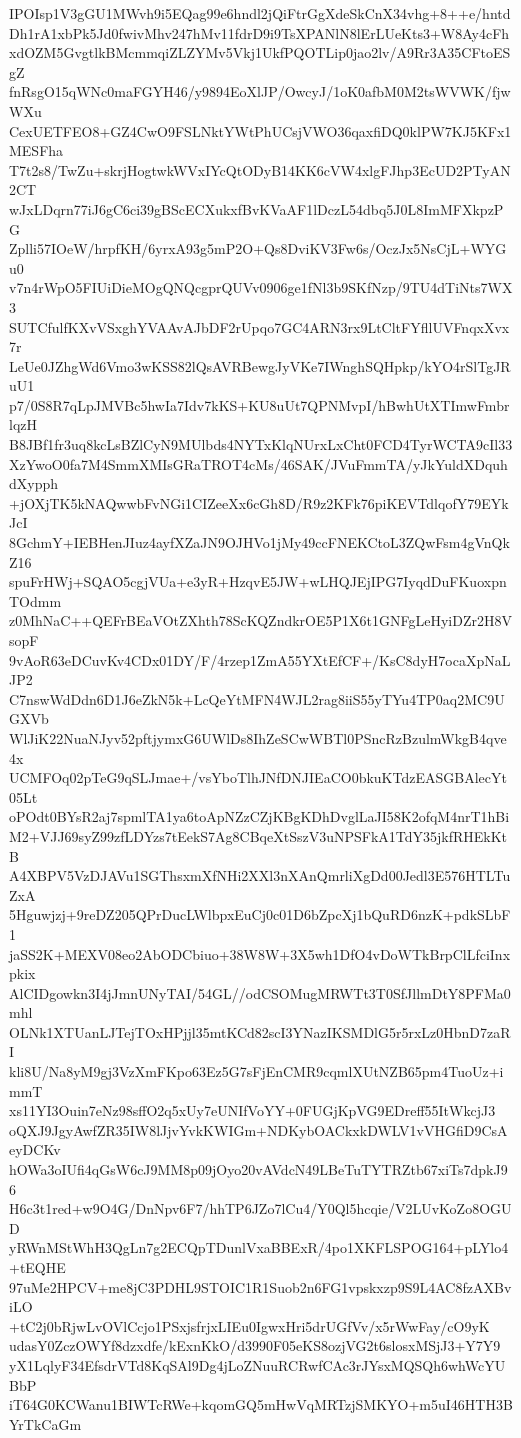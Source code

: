 IPOIsp1V3gGU1MWvh9i5EQag99e6hndl2jQiFtrGgXdeSkCnX34vhg+8++e/hntd
Dh1rA1xbPk5Jd0fwivMhv247hMv11fdrD9i9TsXPANlN8lErLUeKts3+W8Ay4cFh
xdOZM5GvgtlkBMcmmqiZLZYMv5Vkj1UkfPQOTLip0jao2lv/A9Rr3A35CFtoESgZ
fnRsgO15qWNc0maFGYH46/y9894EoXlJP/OwcyJ/1oK0afbM0M2tsWVWK/fjwWXu
CexUETFEO8+GZ4CwO9FSLNktYWtPhUCsjVWO36qaxfiDQ0klPW7KJ5KFx1MESFha
T7t2s8/TwZu+skrjHogtwkWVxIYcQtODyB14KK6cVW4xlgFJhp3EcUD2PTyAN2CT
wJxLDqrn77iJ6gC6ci39gBScECXukxfBvKVaAF1lDczL54dbq5J0L8ImMFXkpzPG
Zplli57IOeW/hrpfKH/6yrxA93g5mP2O+Qs8DviKV3Fw6s/OczJx5NsCjL+WYGu0
v7n4rWpO5FIUiDieMOgQNQcgprQUVv0906ge1fNl3b9SKfNzp/9TU4dTiNts7WX3
SUTCfulfKXvVSxghYVAAvAJbDF2rUpqo7GC4ARN3rx9LtCltFYfllUVFnqxXvx7r
LeUe0JZhgWd6Vmo3wKSS82lQsAVRBewgJyVKe7IWnghSQHpkp/kYO4rSlTgJRuU1
p7/0S8R7qLpJMVBc5hwIa7Idv7kKS+KU8uUt7QPNMvpI/hBwhUtXTImwFmbrlqzH
B8JBf1fr3uq8kcLsBZlCyN9MUlbds4NYTxKlqNUrxLxCht0FCD4TyrWCTA9cIl33
XzYwoO0fa7M4SmmXMIsGRaTROT4cMs/46SAK/JVuFmmTA/yJkYuldXDquhdXypph
+jOXjTK5kNAQwwbFvNGi1CIZeeXx6cGh8D/R9z2KFk76piKEVTdlqofY79EYkJcI
8GchmY+IEBHenJIuz4ayfXZaJN9OJHVo1jMy49ccFNEKCtoL3ZQwFsm4gVnQkZ16
spuFrHWj+SQAO5cgjVUa+e3yR+HzqvE5JW+wLHQJEjIPG7IyqdDuFKuoxpnTOdmm
z0MhNaC++QEFrBEaVOtZXhth78ScKQZndkrOE5P1X6t1GNFgLeHyiDZr2H8VsopF
9vAoR63eDCuvKv4CDx01DY/F/4rzep1ZmA55YXtEfCF+/KsC8dyH7ocaXpNaLJP2
C7nswWdDdn6D1J6eZkN5k+LcQeYtMFN4WJL2rag8iiS55yTYu4TP0aq2MC9UGXVb
WlJiK22NuaNJyv52pftjymxG6UWlDs8IhZeSCwWBTl0PSncRzBzulmWkgB4qve4x
UCMFOq02pTeG9qSLJmae+/vsYboTlhJNfDNJIEaCO0bkuKTdzEASGBAlecYt05Lt
oPOdt0BYsR2aj7spmlTA1ya6toApNZzCZjKBgKDhDvglLaJI58K2ofqM4nrT1hBi
M2+VJJ69syZ99zfLDYzs7tEekS7Ag8CBqeXtSszV3uNPSFkA1TdY35jkfRHEkKtB
A4XBPV5VzDJAVu1SGThsxmXfNHi2XXl3nXAnQmrliXgDd00Jedl3E576HTLTuZxA
5Hguwjzj+9reDZ205QPrDucLWlbpxEuCj0c01D6bZpcXj1bQuRD6nzK+pdkSLbF1
jaSS2K+MEXV08eo2AbODCbiuo+38W8W+3X5wh1DfO4vDoWTkBrpClLfciInxpkix
AlCIDgowkn3I4jJmnUNyTAI/54GL//odCSOMugMRWTt3T0SfJllmDtY8PFMa0mhl
OLNk1XTUanLJTejTOxHPjjl35mtKCd82scI3YNazIKSMDlG5r5rxLz0HbnD7zaRI
kli8U/Na8yM9gj3VzXmFKpo63Ez5G7sFjEnCMR9cqmlXUtNZB65pm4TuoUz+immT
xs11YI3Ouin7eNz98sffO2q5xUy7eUNIfVoYY+0FUGjKpVG9EDreff55ItWkcjJ3
oQXJ9JgyAwfZR35IW8lJjvYvkKWIGm+NDKybOACkxkDWLV1vVHGfiD9CsAeyDCKv
hOWa3oIUfi4qGsW6cJ9MM8p09jOyo20vAVdcN49LBeTuTYTRZtb67xiTs7dpkJ96
H6c3t1red+w9O4G/DnNpv6F7/hhTP6JZo7lCu4/Y0Ql5hcqie/V2LUvKoZo8OGUD
yRWnMStWhH3QgLn7g2ECQpTDunlVxaBBExR/4po1XKFLSPOG164+pLYlo4+tEQHE
97uMe2HPCV+me8jC3PDHL9STOIC1R1Suob2n6FG1vpskxzp9S9L4AC8fzAXBviLO
+tC2j0bRjwLvOVlCcjo1PSxjsfrjxLIEu0IgwxHri5drUGfVv/x5rWwFay/cO9yK
udasY0ZczOWYf8dzxdfe/kExnKkO/d3990F05eKS8ozjVG2t6slosxMSjJ3+Y7Y9
yX1LqlyF34EfsdrVTd8KqSAl9Dg4jLoZNuuRCRwfCAc3rJYsxMQSQh6whWcYUBbP
iT64G0KCWanu1BIWTcRWe+kqomGQ5mHwVqMRTzjSMKYO+m5uI46HTH3BYrTkCaGm
